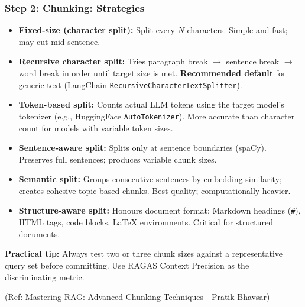 \begin{frame}[fragile]\frametitle{Step 2: Chunking: Strategies}

\begin{itemize}
  \item \textbf{Fixed-size (character split):} Split every $N$ characters. Simple and fast; may cut mid-sentence.

  \item \textbf{Recursive character split:} Tries paragraph break $\rightarrow$ sentence break $\rightarrow$ word break in order until target size is met. \textbf{Recommended default} for generic text (LangChain \texttt{RecursiveCharacterTextSplitter}).

  \item \textbf{Token-based split:} Counts actual LLM tokens using the target model's tokenizer (e.g., HuggingFace \texttt{AutoTokenizer}). More accurate than character count for models with variable token sizes.

  \item \textbf{Sentence-aware split:} Splits only at sentence boundaries (spaCy). Preserves full sentences; produces variable chunk sizes.

  \item \textbf{Semantic split:} Groups consecutive sentences by embedding similarity; creates cohesive topic-based chunks. Best quality; computationally heavier.

  \item \textbf{Structure-aware split:} Honours document format: Markdown headings (\texttt{\#}), HTML tags, code blocks, LaTeX environments. Critical for structured documents.
\end{itemize}

\vspace{0.2em}
\textbf{Practical tip:} Always test two or three chunk sizes against a representative query set before committing. Use RAGAS Context Precision as the discriminating metric.

{\tiny (Ref: Mastering RAG: Advanced Chunking Techniques - Pratik Bhavsar)}

\end{frame}


